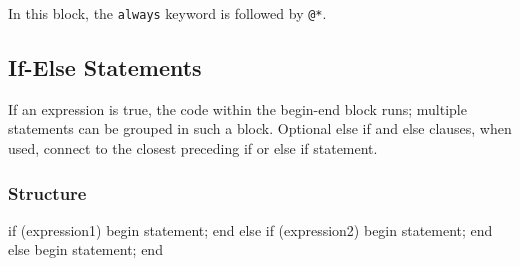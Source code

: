 \documentclass[12pt,openany]{book}
\begin{document}
In this block, the \texttt{always} keyword is followed by \texttt{@*}.

\subsection{If-Else Statements}
If an expression is true, the code within the begin-end block runs; multiple statements can be grouped in such a block. Optional else if and else clauses, when used, connect to the closest preceding if or else if statement.
\noindent
\subsubsection{Structure}
\begin{vhdl}
if (expression1)
begin
	statement;
end
else if (expression2)
begin
	statement;
end
else
begin
	statement;
end
\end{vhdl}
\end{document}
